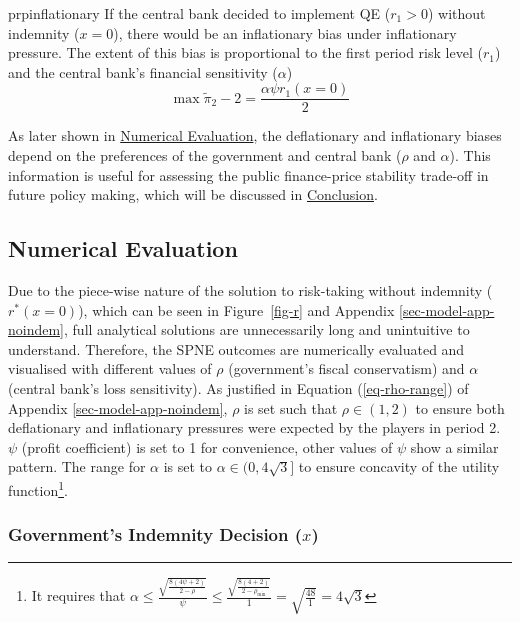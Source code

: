 \documentclass[
  a4paper,
  abstract=true]{scrartcl}
\theoremstyle{definition}
\begin{document}
\begin{restatable}{prp}{inflationary}
\label{prp-inflationary}
If the central bank decided to implement QE ($r_1>0$) without indemnity ($x=0$),
there would be an inflationary bias under inflationary pressure. The extent of this bias is proportional to the first period risk level ($r_1$) and the central bank's financial sensitivity ($\alpha$)
$$
\max\tilde\pi_2-2=\frac{\alpha\psi r_1(x=0)}{2}
$$
\end{restatable}

As later shown in \hyperref[sec-simulation]{Numerical Evaluation}, the
deflationary and inflationary biases depend on the preferences of the
government and central bank (\(\rho\) and \(\alpha\)). This information
is useful for assessing the public finance-price stability trade-off in
future policy making, which will be discussed in
\hyperref[sec-conclusion]{Conclusion}.

\subsection{Numerical Evaluation}\label{sec-simulation}

Due to the piece-wise nature of the solution to risk-taking without
indemnity (\(r^*(x=0)\)), which can be seen in Figure~\ref{fig-r} and
Appendix \ref{sec-model-app-noindem}, full analytical solutions are
unnecessarily long and unintuitive to understand. Therefore, the SPNE
outcomes are numerically evaluated and visualised with different values
of \(\rho\) (government's fiscal conservatism) and \(\alpha\) (central
bank's loss sensitivity). As justified in Equation (\ref{eq-rho-range})
of Appendix \ref{sec-model-app-noindem}, \(\rho\) is set such that
\(\rho\in(1,2)\) to ensure both deflationary and inflationary pressures
were expected by the players in period 2. \(\psi\) (profit coefficient)
is set to 1 for convenience, other values of \(\psi\) show a similar
pattern. The range for \(\alpha\) is set to \(\alpha\in(0,4\sqrt3]\) to
ensure concavity of the utility function\footnote{It requires that
  \(\alpha\leq\frac{\sqrt{\frac{8(4\psi+2)}{2-\rho}}}{\psi}\leq\frac{\sqrt{\frac{8(4+2)}{2-\rho_{\min} }}}{1}=\sqrt{\frac{48}{1}}=4\sqrt3\)}.

\subsubsection{\texorpdfstring{Government's Indemnity Decision
(\(x\))}{Government's Indemnity Decision (x)}}\label{sec-indemnity}
\end{document}
